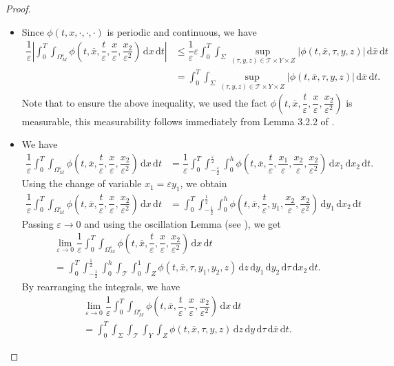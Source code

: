 \documentclass[11pt]{article}
\def\es{\varepsilon}
\def\omm{\Omega_M^\varepsilon}
\def\mint{\int_{0}^{T}\int_{\Sigma}\int_{\mathcal{T}}\int_{Y}\int_{Z}}
\def\T{\mathcal{T}}
\newcommand{\di}[1]{\,\mathrm{d}#1}
\begin{document}
	\begin{proof}
	    
	\begin{itemize}
	    \item [(i)] Since $\phi(t,x,\cdot,\cdot,\cdot)$ is periodic and continuous, we have
	    \begin{align*}
	         \dfrac{1}{\es}\left|\int_0^T\int_{\omm}\phi\left(t,\overline{x},\dfrac{t}{\es}, \dfrac{x}{\es},\dfrac{x_2}{\es^2}\right)\di{x}\di{t}\right|&\leq \dfrac{1}{\es}\es \int_0^T\int_{\Sigma}\sup_{(\tau,y,z)\in {\T\times Y\times Z}} |\phi(t,\overline{x},\tau,y,z)| \di{\overline{x}}\di{t}\\
	         &=\int_0^T\int_{\Sigma}\sup_{(\tau,y,z)\in {\T\times Y\times Z}} |\phi(t,\overline{x},\tau,y,z)| \di{\overline{x}}\di{t}.
	    \end{align*}
	    Note that to ensure the above inequality, we used the fact $\phi\left(t,\overline{x},\dfrac{t}{\es}, \dfrac{x}{\es},\dfrac{x_2}{\es^2}\right)$ is measurable, this measurability follows immediately from Lemma 3.2.2 of \cite{bhattacharya2023homogenization}.
	    \item[(ii)] We have 
	    \begin{align*}
	         \dfrac{1}{\es}\int_0^T\int_{\omm}\phi\left(t,\overline{x},\dfrac{t}{\es}, \dfrac{x}{\es},\dfrac{x_2}{\es^2}\right)\di{x}\di{t}&= \dfrac{1}{\es}\int_0^T\int_{-\frac{\es}{2}}^{\frac{\es}{2}}\int_{0}^h\phi\left(t,\overline{x},\dfrac{t}{\es}, \dfrac{x_1}{\es},\dfrac{x_2}{\es},\dfrac{x_2}{\es^2}\right)\di{x_1}\di{x_2}\di{t}.
	    \end{align*}
	    Using the change of variable $x_1=\es y_1$, we obtain
	        \begin{align*}
	         \dfrac{1}{\es}\int_0^T\int_{\omm}\phi\left(t,\overline{x},\dfrac{t}{\es}, \dfrac{x}{\es},\dfrac{x_2}{\es^2}\right)\di{x}\di{t}&= \int_0^T\int_{-\frac{1}{2}}^{\frac{1}{2}}\int_{0}^h\phi\left(t,\overline{x},\dfrac{t}{\es}, {y_1},\dfrac{x_2}{\es},\dfrac{x_2}{\es^2}\right)\di{y_1}\di{x_2}\di{t}
	    \end{align*}
	    Passing $\es\rightarrow 0$ and using the oscillation Lemma (see \cite[Theorem 2.6]{cioranescu1999introduction}), we get
	    \begin{multline*}
	        \lim_{\es\rightarrow 0} \dfrac{1}{\es}\int_0^T\int_{\omm}\phi\left(t,\overline{x},\dfrac{t}{\es}, \dfrac{x}{\es},\dfrac{x_2}{\es^2}\right)\di{x}\di{t}\\= \int_0^T\int_{-\frac{1}{2}}^{\frac{1}{2}}\int_{0}^h\int_\T\int_0^1\int_Z\phi\left(t,\overline{x},\tau, {y_1},y_2,z\right)\di{z}\di{y_1}\di{y_2}\di{\tau}\di{x_2}\di{t}.
	    \end{multline*}
	    By rearranging the integrals, we have
	    \begin{multline*}
	        \lim_{\es\rightarrow 0} \dfrac{1}{\es}\int_0^T\int_{\omm}\phi\left(t,\overline{x},\dfrac{t}{\es}, \dfrac{x}{\es},\dfrac{x_2}{\es^2}\right)\di{x}\di{t}\\= \mint \phi(t,\overline{x},\tau,y,{z}) \di{z}\di{y}\di{\tau}\di{\overline{x}}\di{t}.
	    \end{multline*}
	\end{itemize}
	\end{proof}
\end{document}
